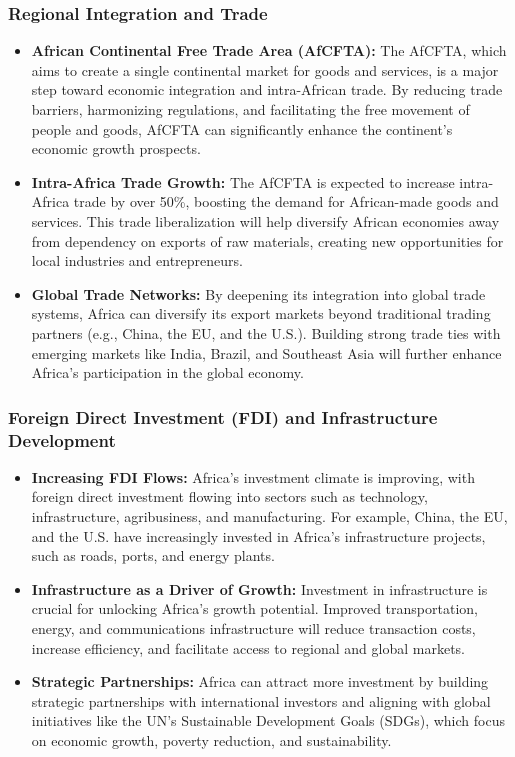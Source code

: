 \documentclass[10pt]{article}
\begin{document}
\subsubsection*{Regional Integration and Trade}
\begin{itemize}
  \item \textbf{African Continental Free Trade Area (AfCFTA):} The AfCFTA, which aims to create
    a single continental market for goods and services, is a major step toward
    economic integration and intra-African trade. By reducing trade barriers,
    harmonizing regulations, and facilitating the free movement of people and goods,
    AfCFTA can significantly enhance the continent's economic growth prospects.

  \item \textbf{Intra-Africa Trade Growth:} The AfCFTA is expected to increase intra-Africa trade
    by over 50\%, boosting the demand for African-made goods and services. This
    trade liberalization will help diversify African economies away from dependency
    on exports of raw materials, creating new opportunities for local industries and
    entrepreneurs.

  \item \textbf{Global Trade Networks:} By deepening its integration into global trade systems,
    Africa can diversify its export markets beyond traditional trading partners (e.g.,
    China, the EU, and the U.S.). Building strong trade ties with emerging markets like
    India, Brazil, and Southeast Asia will further enhance Africa's participation in the
    global economy.
\end{itemize}

\subsubsection*{Foreign Direct Investment (FDI) and Infrastructure Development}
\begin{itemize}
  \item \textbf{Increasing FDI Flows:} Africa's investment climate is improving, with foreign direct
    investment flowing into sectors such as technology, infrastructure, agribusiness,
    and manufacturing. For example, China, the EU, and the U.S. have increasingly
    invested in Africa's infrastructure projects, such as roads, ports, and energy
    plants.

  \item \textbf{Infrastructure as a Driver of Growth:} Investment in infrastructure is crucial for
    unlocking Africa's growth potential. Improved transportation, energy, and
    communications infrastructure will reduce transaction costs, increase efficiency,
    and facilitate access to regional and global markets.

  \item \textbf{Strategic Partnerships:} Africa can attract more investment by building strategic
    partnerships with international investors and aligning with global initiatives like
    the UN's Sustainable Development Goals (SDGs), which focus on economic
    growth, poverty reduction, and sustainability.
\end{itemize}
\end{document}
